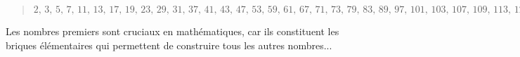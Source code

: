 \documentclass[a4paper,12pt]{report}
\begin{document}
\begin{quotation}
\noindent$2,\allowbreak\, 3,\allowbreak\, 5,\allowbreak\, 7,\allowbreak\, 11,\allowbreak\, 13,\allowbreak\, 17,\allowbreak\, 19,\allowbreak\, 23,\allowbreak\, 29,\allowbreak\, 31,\allowbreak\, 37,\allowbreak\, 41,\allowbreak\, 43,\allowbreak\, 47,\allowbreak\, 53,\allowbreak\, 59,\allowbreak\, 61,\allowbreak\, 67,\allowbreak\, 71,\allowbreak\, 73,\allowbreak\, 79,\allowbreak\, 83,\allowbreak\, 89,\allowbreak\, 97,\allowbreak\, 101,\allowbreak\, 103,\allowbreak\, 107,\allowbreak\, 109,\allowbreak\, 113,\allowbreak\, 127,\allowbreak\, 131,\allowbreak\, 137,\allowbreak\, 139,\allowbreak\, 149,\allowbreak\, 151,\allowbreak\, 157,\allowbreak\, 163,\allowbreak\, 167,\allowbreak\, 173,\allowbreak\, 179,\allowbreak\, 181,\allowbreak\, 191,\allowbreak\, 193,\allowbreak\, 197,\allowbreak\, 199,\allowbreak\, 211,\allowbreak\, 223,\allowbreak\, 227,\allowbreak\, 229,\allowbreak\, 233,\allowbreak\, 239,\allowbreak\, 241,\allowbreak\, 251,\allowbreak\, 257,\allowbreak\, 263,\allowbreak\, 269,\allowbreak\, 271,\allowbreak\, 277,\allowbreak\, 281,\allowbreak\, 283,\allowbreak\, 293,\allowbreak\, 307,\allowbreak\, 311,\allowbreak\, 313,\allowbreak\, 317,\allowbreak\, 331,\allowbreak\, 337,\allowbreak\, 347,\allowbreak\, 349,\allowbreak\, 353,\allowbreak\, 359,\allowbreak\, 367,\allowbreak\, 373,\allowbreak\, 379,\allowbreak\, 383,\allowbreak\, 389,\allowbreak\, 397,\allowbreak\, 401,\allowbreak\, 409,\allowbreak\, 419,\allowbreak\, 421,\allowbreak\, 431,\allowbreak\, 433,\allowbreak\, 439,\allowbreak\, 443,\allowbreak\, 449,\allowbreak\, 457,\allowbreak\, 461,\allowbreak\, 463,\allowbreak\, 467,\allowbreak\, 479,\allowbreak\, 487,\allowbreak\, 491,\allowbreak\, 499,\allowbreak\, 503,\allowbreak\, 509,\allowbreak\, 521,\allowbreak\, 523,\allowbreak\, 541.$
\end{quotation}

Les nombres premiers sont cruciaux en mathématiques, car ils constituent les briques élémentaires qui permettent de construire tous les autres nombres...
\end{document}
